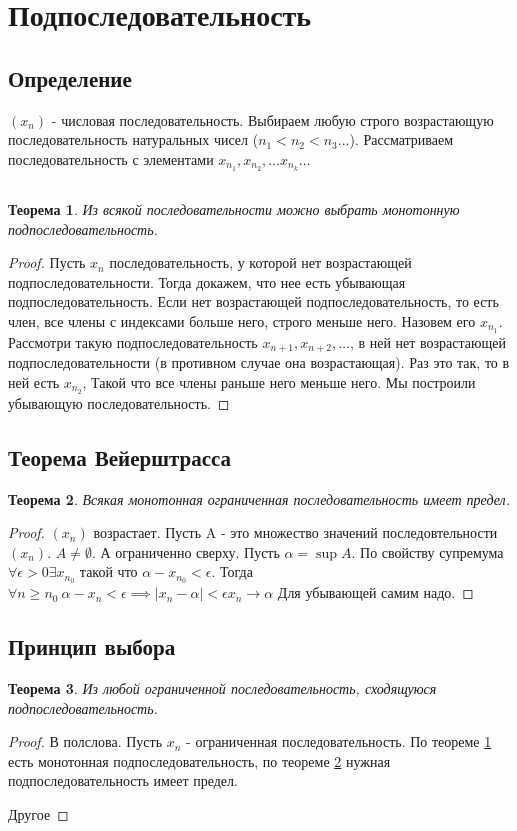 \documentclass{article}
\newtheorem{theorem}{Теорема}
\begin{document}
\section{Подпоследовательность}
\subsection{Определение}
$(x_n)$ - числовая последовательность. Выбираем любую строго возрастающую последовательность натуральных чисел ($n_1 < n_2  < n_3 \dots $). Рассматриваем последовательность с элементами $x_{n_1}, x_{n_2}, \dots x_{n_{k}} \dots$
\subsection{}
\begin{theorem} \label{1}
    Из всякой последовательности можно выбрать монотонную подпоследовательность.
\end{theorem}
\begin{proof}

   Пусть $x_n$ последовательность, у которой нет возрастающей подпоследовательности. Тогда 
   докажем, что нее есть убывающая подпоследовательность. Если нет возрастающей подпоследовательность, то
   есть член, все члены с индексами больше него, строго меньше него. Назовем его $x_{n_1}$.
   Рассмотри такую подпоследовательность $x_{n +1} , x_{n + 2},\dots$, в ней нет возрастающей подпоследовательности (в противном случае она возрастающая). Раз это так, то в ней есть  $x_{n_2}$, Такой что все члены раньше него меньше него. Мы построили убывающую последовательность.
\end{proof}
\subsection{Теорема Вейерштрасса}
\begin{theorem} \label{weir}
    Всякая монотонная ограниченная последовательность имеет предел.
\end{theorem}
\begin{proof}
    $(x_n)$ возрастает. Пусть A - это множество значений последовтельности  $(x_n)$. $A \neq \emptyset$.
    А ограниченно сверху. Пусть $\alpha = \sup{A}$. По свойству супремума  $\forall \epsilon > 0 \exists x_{n_0}$ такой что $\alpha - x_{n_0} < \epsilon$. Тогда  $\forall  n\ge n_0 ~ \alpha -x_{n} < \epsilon \implies \mid x_n -\alpha \mid < \epsilon x_n \to \alpha$
    Для убывающей самим надо.
\end{proof}
\subsection{Принцип выбора}
\begin{theorem}
    Из любой ограниченной последовательность, сходящуюся подпоследовательность.
\end{theorem}
\begin{proof}
    В полслова. Пусть $x_n$ - ограниченная последовательность. По теореме \ref{1} есть монотонная подпоследовательность, по теореме \ref{weir} нужная подпоследовательность имеет предел.

    Другое
\end{proof}
\end{document}
